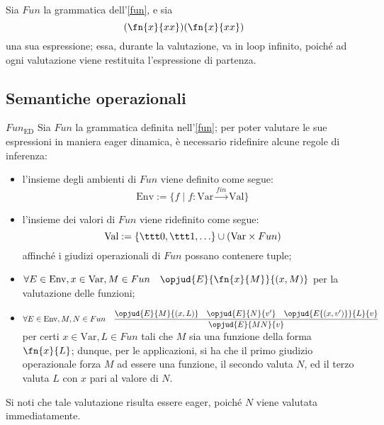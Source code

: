 \documentclass[a4paper, 12pt]{report}
\begin{document}
    \begin{example}[Curryficazioni]
        Sia $Fun$ la grammatica dell'\cref{fun}, e sia $$(\fn{x}{xx})(\fn{x}{xx})$$ una sua espressione; essa, durante la valutazione, va in loop infinito, poiché ad ogni valutazione viene restituita l'espressione di partenza.
    \end{example}

    \subsection{Semantiche operazionali}

    \begin{framedprop}{$Fun_\mathrm{ED}$}
        Sia $Fun$ la grammatica definita nell'\cref{fun}; per poter valutare le sue espressioni in maniera eager dinamica, è necessario ridefinire alcune regole di inferenza:

        \begin{itemize}
            \item l'insieme degli ambienti di $Fun$ viene definito come segue: $$\mathrm{Env} := \{f \mid f : \mathrm{Var} \xrightarrow{fin} \mathrm{Val}\}$$
            \item l'insieme dei valori di $Fun$ viene ridefinito come segue: $$\mathrm{Val} := \{ \ttt 0, \ttt 1 , \ldots \} \cup (\mathrm{Var} \times Fun)$$ affinché i giudizi operazionali di $Fun$ possano contenere tuple;
            \item $\forall E \in \mathrm{Env}, x \in \mathrm{Var}, M \in Fun \quad \opjud{E}{\fn{x}{M}}{(x,M)}$ per la valutazione delle funzioni;
            \item $\forall E \in \mathrm{Env}, M,N \in Fun \quad \dfrac{\opjud{E}{M}{(x,L)} \quad \opjud{E}{N}{v'} \quad \opjud{E\{(x,v')\}}{L}{v}}{\opjud{E}{MN}{v}}$ per certi $x \in \mathrm{Var}, L \in Fun$ tali che $M$ sia una funzione della forma $\fn{x}{L}$; dunque, per le applicazioni, si ha che il primo giudizio operazionale forza $M$ ad essere una funzione, il secondo valuta $N$, ed il terzo valuta $L$ con $x$ pari al valore di $N$.
        \end{itemize}

        Si noti che tale valutazione risulta essere eager, poiché $N$ viene valutata immediatamente.
    \end{framedprop}
\end{document}
